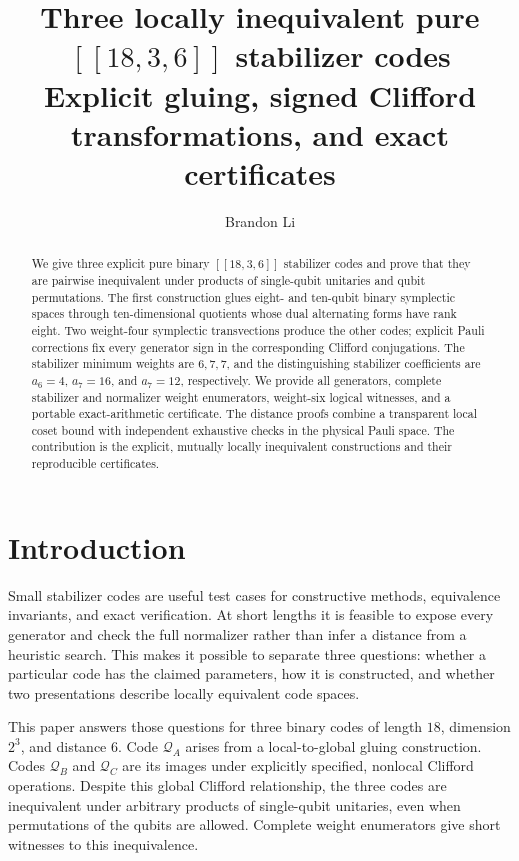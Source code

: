 \documentclass[11pt,a4paper]{article}
\title{Three locally inequivalent pure $[[18,3,6]]$ stabilizer codes\\[3pt]\large Explicit gluing, signed Clifford transformations, and exact certificates}
\author{Brandon Li}
\date{}
\newcommand{\CA}{\mathcal Q_A}
\newcommand{\CB}{\mathcal Q_B}
\newcommand{\CC}{\mathcal Q_C}
\begin{document}
\maketitle
\vspace{-1.5em}
\begin{abstract}
We give three explicit pure binary $[[18,3,6]]$ stabilizer codes and prove that they are pairwise inequivalent under products of single-qubit unitaries and qubit permutations. The first construction glues eight- and ten-qubit binary symplectic spaces through ten-dimensional quotients whose dual alternating forms have rank eight. Two weight-four symplectic transvections produce the other codes; explicit Pauli corrections fix every generator sign in the corresponding Clifford conjugations. The stabilizer minimum weights are $6,7,7$, and the distinguishing stabilizer coefficients are $a_6=4$, $a_7=16$, and $a_7=12$, respectively. We provide all generators, complete stabilizer and normalizer weight enumerators, weight-six logical witnesses, and a portable exact-arithmetic certificate. The distance proofs combine a transparent local coset bound with independent exhaustive checks in the physical Pauli space. The contribution is the explicit, mutually locally inequivalent constructions and their reproducible certificates.
\end{abstract}

\section{Introduction}
Small stabilizer codes are useful test cases for constructive methods, equivalence invariants, and exact verification. At short lengths it is feasible to expose every generator and check the full normalizer rather than infer a distance from a heuristic search. This makes it possible to separate three questions: whether a particular code has the claimed parameters, how it is constructed, and whether two presentations describe locally equivalent code spaces.

This paper answers those questions for three binary codes of length $18$, dimension $2^3$, and distance $6$. Code $\CA$ arises from a local-to-global gluing construction. Codes $\CB$ and $\CC$ are its images under explicitly specified, nonlocal Clifford operations. Despite this global Clifford relationship, the three codes are inequivalent under arbitrary products of single-qubit unitaries, even when permutations of the qubits are allowed. Complete weight enumerators give short witnesses to this inequivalence.
\end{document}
